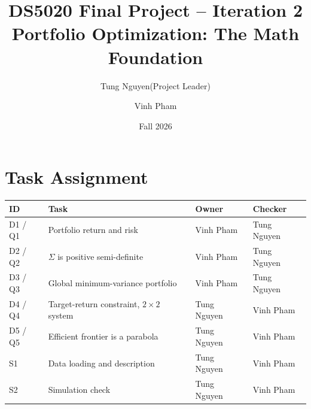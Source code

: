 \documentclass[11pt]{article}
\title{DS5020 Final Project -- Iteration 2\\[2pt]
\large Portfolio Optimization: The Math Foundation}
\author{Tung Nguyen(Project Leader) \and Vinh Pham\\[4pt]}
\date{Fall 2026}
\theoremstyle{plain}
\theoremstyle{definition}
\begin{document}
\maketitle

\section*{Task Assignment}
\begin{tabular}{@{}llll@{}}
\toprule
ID & Task & Owner & Checker \\
\midrule
D1 / Q1 & Portfolio return and risk                  & Vinh Pham & Tung Nguyen \\
D2 / Q2 & $\Sigma$ is positive semi-definite         & Vinh Pham & Tung Nguyen \\
D3 / Q3 & Global minimum-variance portfolio          & Vinh Pham & Tung Nguyen \\
D4 / Q4 & Target-return constraint, $2\times2$ system & Tung Nguyen & Vinh Pham \\
D5 / Q5 & Efficient frontier is a parabola           & Tung Nguyen & Vinh Pham \\
S1      & Data loading and description               & Tung Nguyen & Vinh Pham \\
S2      & Simulation check                           & Tung Nguyen & Vinh Pham \\
\bottomrule
\end{tabular}

\end{document}
